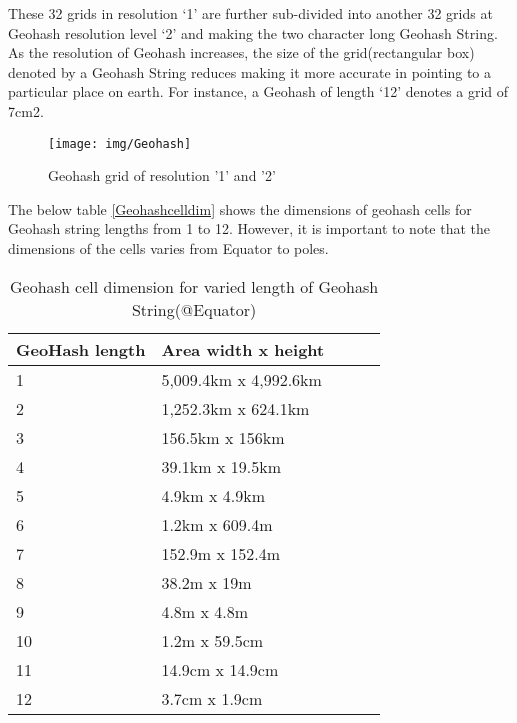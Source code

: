 \documentclass[article,type=msc,colorback,10pt,accentcolor=tud1d]{tudthesis}
\begin{document}
		   These 32 grids in resolution ‘1’ are further sub-divided into another 32 grids at Geohash resolution level ‘2’ and making the two character long Geohash String. As the resolution of Geohash increases, the size of the grid(rectangular box) denoted by a Geohash String reduces making it more accurate in pointing to a particular place on earth. For instance, a Geohash of length ‘12’ denotes a grid of 7cm2.
			
				\begin{figure}
				\centering
				\texttt{[image: img/Geohash]}
				\caption{Geohash grid of resolution '1' and '2'}
				\label{fig:Geohash}
				\end{figure}
						   
		   The below table \ref{Geohashcelldim} shows the dimensions of geohash cells for Geohash string lengths from 1 to 12. However, it is important to note that the dimensions of the cells varies from Equator to poles. 
		   \cite{elastic_geohash}
		   
		   \begin{table}[h]
		   	\centering
		   	\begin{tabular}[htbp]{llllc}
		   		\\	\hline 
		   		
		   		\textbf{GeoHash length}			&\textbf{Area width x height}  \\
		   		\hline
		   		1				&5,009.4km x 4,992.6km \\
		   		2				&1,252.3km x 624.1km \\
		   		3				&156.5km x 156km \\
		   		4				&39.1km x 19.5km \\
		   		5				&4.9km x 4.9km \\
		   		6				&1.2km x 609.4m \\
		   		7				&152.9m x 152.4m \\
		   		8				&38.2m x 19m \\
		   		9				&4.8m x 4.8m \\
		   		10				&1.2m x 59.5cm \\
		   		11				&14.9cm x 14.9cm \\
		   		12				&3.7cm x 1.9cm \\
		   		
		   		\hline
		   	\end{tabular}
		   	\caption{Geohash cell dimension for varied length of Geohash String(@Equator)}
		   	\label{tab:Geohash Resolution}
		   \end{table}
		   
\end{document}
